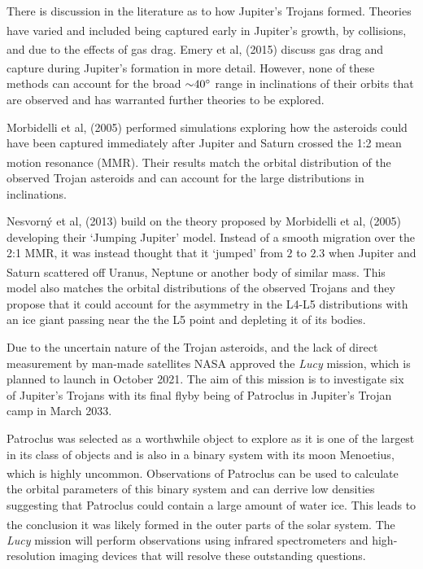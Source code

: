 \documentclass[10pt, twocolumn]{revtex4}    %
\newcommand{\scite}[1]{\textsuperscript{\cite{#1}}}
\begin{document}
There is discussion in the literature as to how Jupiter's Trojans formed. Theories have varied and included being captured early in Jupiter's growth,\scite{FlemingoriginTrojanasteroids2000} by collisions,\scite{ShoemakerTrojanasteroidsPopulations1989} and due to the effects of gas drag.\scite{KortenkampCaptureTrojanAsteroids2001} Emery et al, (2015) discuss gas drag and capture during Jupiter's formation in more detail.\textsuperscript{\cite{EmeryComplexHistoryTrojan2015}} However, none  of these methods can account for the broad ${\sim}40\degree$ range in inclinations of their orbits that are observed and has warranted further theories to be explored.

Morbidelli et al, (2005) performed simulations exploring how the asteroids could have been captured immediately after Jupiter and Saturn crossed the 1:2 mean motion resonance (MMR).\textsuperscript{\cite{MorbidelliChaoticcaptureJupiter2005a}} Their results match the orbital distribution of the observed Trojan asteroids and can account for the large distributions in inclinations.
 
Nesvorn\'y et al, (2013) build on the theory proposed by Morbidelli et al, (2005) developing their `Jumping Jupiter' model. Instead of a smooth migration over the 2:1 MMR, it was instead thought that it `jumped' from $2$ to $2.3$ when Jupiter and Saturn scattered off Uranus, Neptune or another body of similar mass.\scite{NesvornyCaptureTrojansJumping2013} This model also matches the orbital distributions of the observed Trojans and they propose that it could account for the asymmetry in the L4-L5 distributions with an ice giant passing near the the L5 point and depleting it of its bodies.

Due to the uncertain nature of the Trojan asteroids, and the lack of direct measurement by man-made satellites NASA approved the \textit{Lucy} mission, which is planned to launch in October 2021. The aim of this mission is to investigate six of Jupiter's Trojans with its final flyby being of Patroclus in Jupiter's Trojan camp in March 2033. 

Patroclus was selected as a worthwhile object to explore as it is one of the largest in its class of objects and is also in a binary system with its moon Menoetius, which is highly uncommon.\scite{BuieSIZESHAPESTELLAR2015} Observations of Patroclus can be used to calculate the orbital parameters of this binary system and can derrive low densities suggesting that Patroclus could contain a large amount of water ice. This leads to the conclusion it was likely formed in the outer parts of the solar system.\scite{Marchislowdensity8gcm32006}\scite{YangSpectroscopicSearchWater2006} The \textit{Lucy} mission will perform observations using infrared spectrometers and high-resolution imaging devices that will resolve these outstanding questions. 
\end{document}
